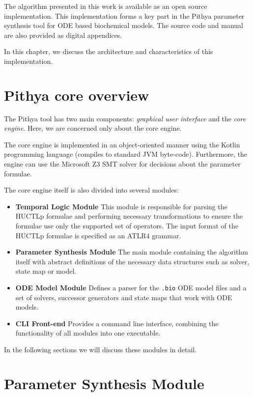 The algorithm presented in this work is available as an open source implementation. This implementation forms a key part in the Pithya \cite{pithya} parameter synthesis tool for ODE based biochemical models. The source code and manual are also provided as digital appendices.

In this chapter, we discuss the architecture and characteristics of this implementation.

\section{Pithya core overview}

The Pithya tool has two main components: \emph{graphical user interface} and the \emph{core engine}. Here, we are concerned only about the core engine.

The core engine is implemented in an object-oriented manner using the Kotlin programming language (compiles to standard JVM byte-code). Furthermore, the engine can use the Microsoft Z3 SMT solver \cite{z3} for decisions about the parameter formulae.

The core engine itself is also divided into several modules:

\begin{itemize}
	\item \textbf{Temporal Logic Module} This module is responsible for parsing the \ac{HUCTLp} formulae and performing necessary transformations to ensure the formulae use only the supported set of operators. The input format of the \ac{HUCTLp} formulae is specified as an ATLR4 \cite{antlr} grammar.
	\item \textbf{Parameter Synthesis Module} The main module containing the algorithm itself with abstract definitions of the necessary data structures such as solver, state map or model.
	\item \textbf{ODE Model Module} Defines a parser for the \texttt{.bio} ODE model files and a set of solvers, successor generators and state maps that work with ODE models.
	\item \textbf{CLI Front-end} Provides a command line interface, combining the functionality of all modules into one executable.
\end{itemize}

In the following sections we will discuss these modules in detail.

\section{Parameter Synthesis Module}

